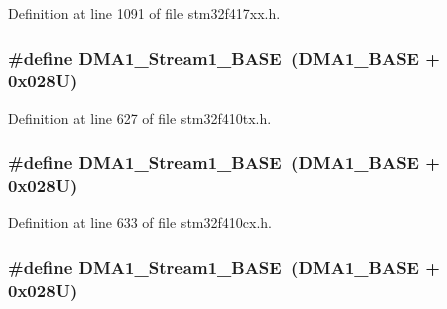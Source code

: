 Definition at line 1091 of file stm32f417xx.\+h.

\subsubsection[{\texorpdfstring{D\+M\+A1\+\_\+\+Stream1\+\_\+\+B\+A\+SE}{DMA1_Stream1_BASE}}]{\setlength{\rightskip}{0pt plus 5cm}\#define D\+M\+A1\+\_\+\+Stream1\+\_\+\+B\+A\+SE~({\bf D\+M\+A1\+\_\+\+B\+A\+SE} + 0x028\+U)}\hypertarget{group___peripheral__registers__structures_ga5b4152cef577e37eccc9311d8bdbf3c2}{}\label{group___peripheral__registers__structures_ga5b4152cef577e37eccc9311d8bdbf3c2}


Definition at line 627 of file stm32f410tx.\+h.

\subsubsection[{\texorpdfstring{D\+M\+A1\+\_\+\+Stream1\+\_\+\+B\+A\+SE}{DMA1_Stream1_BASE}}]{\setlength{\rightskip}{0pt plus 5cm}\#define D\+M\+A1\+\_\+\+Stream1\+\_\+\+B\+A\+SE~({\bf D\+M\+A1\+\_\+\+B\+A\+SE} + 0x028\+U)}\hypertarget{group___peripheral__registers__structures_ga5b4152cef577e37eccc9311d8bdbf3c2}{}\label{group___peripheral__registers__structures_ga5b4152cef577e37eccc9311d8bdbf3c2}


Definition at line 633 of file stm32f410cx.\+h.

\subsubsection[{\texorpdfstring{D\+M\+A1\+\_\+\+Stream1\+\_\+\+B\+A\+SE}{DMA1_Stream1_BASE}}]{\setlength{\rightskip}{0pt plus 5cm}\#define D\+M\+A1\+\_\+\+Stream1\+\_\+\+B\+A\+SE~({\bf D\+M\+A1\+\_\+\+B\+A\+SE} + 0x028\+U)}\hypertarget{group___peripheral__registers__structures_ga5b4152cef577e37eccc9311d8bdbf3c2}{}\label{group___peripheral__registers__structures_ga5b4152cef577e37eccc9311d8bdbf3c2}



